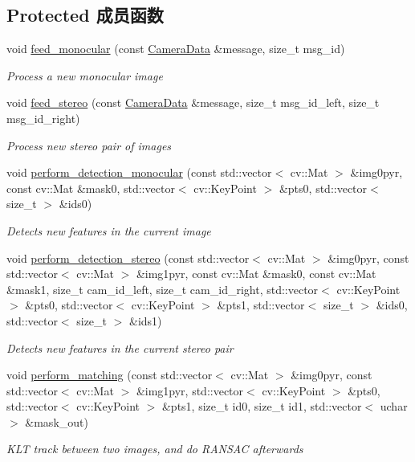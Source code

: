 \subsection*{Protected 成员函数}
\begin{DoxyCompactItemize}
\item 
void \hyperlink{classov__core_1_1TrackKLT_a74d790b70b686f8f4a9788ef765ab3b1}{feed\+\_\+monocular} (const \hyperlink{structov__core_1_1CameraData}{Camera\+Data} \&message, size\+\_\+t msg\+\_\+id)
\begin{DoxyCompactList}\small\item\em Process a new monocular image \end{DoxyCompactList}\item 
void \hyperlink{classov__core_1_1TrackKLT_a7e0f2b1990992ed7dbd916732dd9d7a9}{feed\+\_\+stereo} (const \hyperlink{structov__core_1_1CameraData}{Camera\+Data} \&message, size\+\_\+t msg\+\_\+id\+\_\+left, size\+\_\+t msg\+\_\+id\+\_\+right)
\begin{DoxyCompactList}\small\item\em Process new stereo pair of images \end{DoxyCompactList}\item 
void \hyperlink{classov__core_1_1TrackKLT_a8443c645bf05d2ec7e5e14ae44150bcd}{perform\+\_\+detection\+\_\+monocular} (const std\+::vector$<$ cv\+::\+Mat $>$ \&img0pyr, const cv\+::\+Mat \&mask0, std\+::vector$<$ cv\+::\+Key\+Point $>$ \&pts0, std\+::vector$<$ size\+\_\+t $>$ \&ids0)
\begin{DoxyCompactList}\small\item\em Detects new features in the current image \end{DoxyCompactList}\item 
void \hyperlink{classov__core_1_1TrackKLT_a5c88ad139cd0a0e6633ec604fdee5a86}{perform\+\_\+detection\+\_\+stereo} (const std\+::vector$<$ cv\+::\+Mat $>$ \&img0pyr, const std\+::vector$<$ cv\+::\+Mat $>$ \&img1pyr, const cv\+::\+Mat \&mask0, const cv\+::\+Mat \&mask1, size\+\_\+t cam\+\_\+id\+\_\+left, size\+\_\+t cam\+\_\+id\+\_\+right, std\+::vector$<$ cv\+::\+Key\+Point $>$ \&pts0, std\+::vector$<$ cv\+::\+Key\+Point $>$ \&pts1, std\+::vector$<$ size\+\_\+t $>$ \&ids0, std\+::vector$<$ size\+\_\+t $>$ \&ids1)
\begin{DoxyCompactList}\small\item\em Detects new features in the current stereo pair \end{DoxyCompactList}\item 
void \hyperlink{classov__core_1_1TrackKLT_a7747a5ceca5c530350cf0c745a33bfe5}{perform\+\_\+matching} (const std\+::vector$<$ cv\+::\+Mat $>$ \&img0pyr, const std\+::vector$<$ cv\+::\+Mat $>$ \&img1pyr, std\+::vector$<$ cv\+::\+Key\+Point $>$ \&pts0, std\+::vector$<$ cv\+::\+Key\+Point $>$ \&pts1, size\+\_\+t id0, size\+\_\+t id1, std\+::vector$<$ uchar $>$ \&mask\+\_\+out)
\begin{DoxyCompactList}\small\item\em K\+LT track between two images, and do R\+A\+N\+S\+AC afterwards \end{DoxyCompactList}\end{DoxyCompactItemize}
